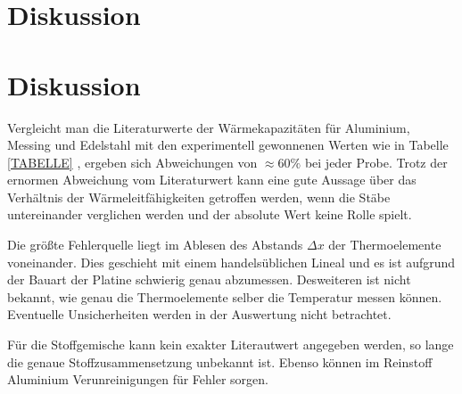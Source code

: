 \section{Diskussion}
\label{sec:Diskussion}
\section{Diskussion}
\label{sec:Diskussion}

Vergleicht man die Literaturwerte der Wärmekapazitäten für Aluminium, Messing und Edelstahl mit den experimentell gewonnenen Werten wie in Tabelle \eqref{TABELLE}%
, ergeben sich Abweichungen von $\approx60\%$ bei jeder Probe. Trotz der ernormen Abweichung vom Literaturwert kann eine gute Aussage über das Verhältnis der Wärmeleitfähigkeiten getroffen werden, wenn die Stäbe untereinander verglichen werden und der absolute Wert keine Rolle spielt.

Die größte Fehlerquelle liegt im Ablesen des Abstands $\Delta{x}$ der Thermoelemente voneinander. Dies geschieht mit einem handelsüblichen Lineal und es ist aufgrund der Bauart der Platine schwierig genau abzumessen. Desweiteren ist nicht bekannt, wie genau die Thermoelemente selber die Temperatur messen können. Eventuelle Unsicherheiten werden in der Auswertung nicht betrachtet.

Für die Stoffgemische kann kein exakter Literautwert angegeben werden, so lange die genaue Stoffzusammensetzung unbekannt ist. Ebenso können im Reinstoff Aluminium Verunreinigungen für Fehler sorgen. 
